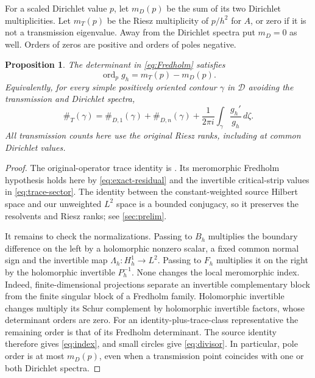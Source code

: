 \documentclass[11pt,a4paper]{article}
\DeclareMathOperator{\ord}{ord}
\newtheorem{proposition}[proposition]{Proposition}
\theoremstyle{remark}
\numberwithin{equation}{section}
\begin{document}
For a scaled Dirichlet value $p$, let $m_D(p)$ be the sum of its two
Dirichlet multiplicities. Let $m_T(p)$ be the Riesz multiplicity of
$p/h^2$ for $A$, or zero if it is not a transmission eigenvalue.
Away from the Dirichlet spectra put $m_D=0$ as well. Orders of zeros
are positive and orders of poles negative.

\begin{proposition}\label{prop:index}
The determinant in \eqref{eq:Fredholm} satisfies
\begin{equation}\label{eq:divisor}
 \ord_p g_h=m_T(p)-m_D(p).
\end{equation}
Equivalently, for every simple positively oriented contour $\gamma$
in $\mathcal D$ avoiding the transmission and Dirichlet spectra,
\begin{equation}\label{eq:index}
 \#_T(\gamma)=\#_{D,1}(\gamma)+\#_{D,n}(\gamma)
 +\frac1{2\pi i}\int_\gamma\frac{g_h'}{g_h}\,d\zeta.
\end{equation}
All transmission counts here use the original Riesz ranks, including at
common Dirichlet values.
\end{proposition}
\begin{proof}
The original-operator trace identity is
\cite[Proposition~3.1, Corollary~3.2 and Lemma~3.6]{PV}. Its
meromorphic Fredholm hypothesis holds here by
\eqref{eq:exact-residual} and the invertible critical-strip values in
\eqref{eq:trace-sector}. The identity between the constant-weighted source Hilbert space and our
unweighted $L^2$ space is a bounded conjugacy, so it preserves the
resolvents and Riesz ranks; see \cref{sec:prelim}.

It remains to check the normalizations. Passing to $B_h$ multiplies
the boundary difference on the left by a holomorphic nonzero scalar,
a fixed common normal sign and the invertible map
$\Lambda_h:H_h^1\to L^2$. Passing to $F_h$ multiplies it on the right
by the holomorphic invertible $P_h^{-1}$. None changes the local
meromorphic index. Indeed, finite-dimensional projections separate an
invertible complementary block from the finite singular block of a
Fredholm family. Holomorphic invertible changes multiply its Schur
complement by holomorphic invertible factors, whose determinant orders
are zero. For an identity-plus-trace-class representative the remaining
order is that of its Fredholm determinant. The source identity therefore
gives \eqref{eq:index}, and small circles give \eqref{eq:divisor}.
In particular, pole order is at most $m_D(p)$, even when a transmission
point coincides with one or both Dirichlet spectra.
\end{proof}
\end{document}

